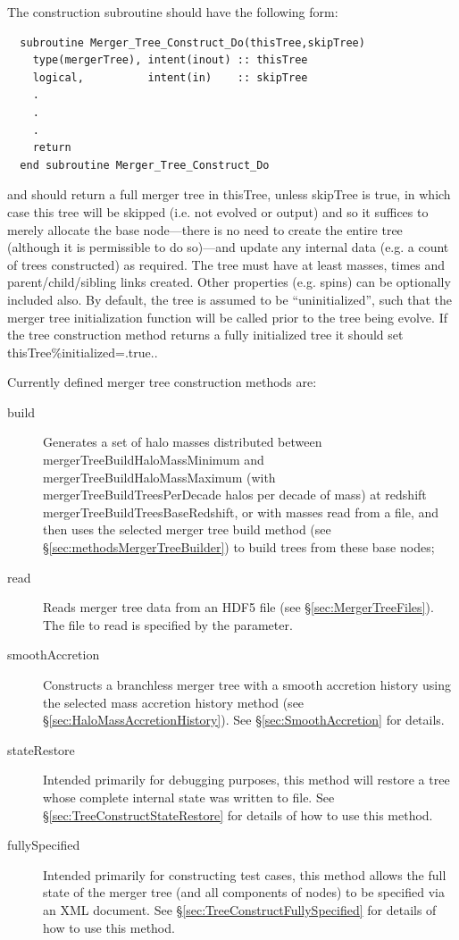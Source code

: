 The construction subroutine should have the following form:
\begin{verbatim}
  subroutine Merger_Tree_Construct_Do(thisTree,skipTree)
    type(mergerTree), intent(inout) :: thisTree
    logical,          intent(in)    :: skipTree
    .
    .
    .
    return
  end subroutine Merger_Tree_Construct_Do
\end{verbatim}
and should return a full merger tree in {\normalfont \ttfamily thisTree}, unless {\normalfont \ttfamily skipTree} is true, in which case this tree will be skipped (i.e. not evolved or output) and so it suffices to merely allocate the base node---there is no need to create the entire tree (although it is permissible to do so)---and update any internal data (e.g. a count of trees constructed) as required. The tree must have at least masses, times and parent/child/sibling links created. Other properties (e.g. spins) can be optionally included also. By default, the tree is assumed to be ``uninitialized'', such that the merger tree initialization function will be called prior to the tree being evolve. If the tree construction method returns a fully initialized tree it should set {\normalfont \ttfamily thisTree\%initialized=.true.}.

Currently defined merger tree construction methods are:
\begin{description}
 \item [{\normalfont \ttfamily build}] Generates a set of halo masses distributed between {\normalfont \ttfamily mergerTreeBuildHaloMassMinimum} and {\normalfont \ttfamily mergerTreeBuildHaloMassMaximum} (with {\normalfont \ttfamily mergerTreeBuildTreesPerDecade} halos per decade of mass) at redshift {\normalfont \ttfamily mergerTreeBuildTreesBaseRedshift}, or with masses read from a file, and then uses the selected merger tree build method (see \S\ref{sec:methodsMergerTreeBuilder}) to build trees from these base nodes;
 \item [{\normalfont \ttfamily read}] Reads merger tree data from an HDF5 file (see \S\ref{sec:MergerTreeFiles}). The file to read is specified by the {\normalfont \ttfamily [mergerTreeReadFileName]} parameter.
 \item [{\normalfont \ttfamily smoothAccretion}] Constructs a branchless merger tree with a smooth accretion history using the selected mass accretion history method (see \S\ref{sec:HaloMassAccretionHistory}). See \S\ref{sec:SmoothAccretion} for details.
 \item [{\normalfont \ttfamily stateRestore}] Intended primarily for debugging purposes, this method will restore a tree whose complete internal state was written to file. See \S\ref{sec:TreeConstructStateRestore} for details of how to use this method.
 \item [{\normalfont \ttfamily fullySpecified}] Intended primarily for constructing test cases, this method allows the full state of the merger tree (and all components of nodes) to be specified via an XML document. See \S\ref{sec:TreeConstructFullySpecified} for details of how to use this method.
\end{description}

